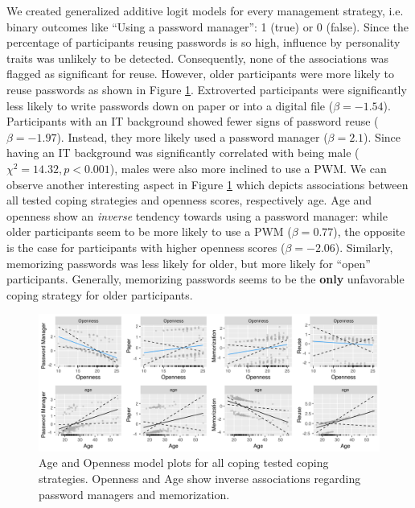 We created generalized additive logit models for every management strategy, i.e. binary outcomes like ``Using a password manager'': 1 (true) or 0 (false). Since the percentage of participants reusing passwords is so high, influence by personality traits was unlikely to be detected. Consequently, none of the associations was flagged as significant for reuse. However, older participants were more likely to reuse passwords as shown in Figure \ref{fig:personality:study3:age-openness-coping-all}. Extroverted participants were significantly less likely to write passwords down on paper or into a digital file ($\beta=-1.54$). Participants with an IT background showed fewer signs of password reuse ($\beta=-1.97$). Instead, they more likely used a password manager ($\beta=2.1$). Since having an IT background was significantly correlated with being male ($\chi^2=14.32, p < 0.001$), males were also more inclined to use a \gls{PWM}. We can observe another interesting aspect in Figure \ref{fig:personality:study3:age-openness-coping-all} which depicts associations between all tested coping strategies and openness scores, respectively age. Age and openness show an \textit{inverse} tendency towards using a password manager: while older participants seem to be more likely to use a \gls{PWM} ($\beta=0.77$), the opposite is the case for participants with higher openness scores ($\beta=-2.06$). Similarly, memorizing passwords was less likely for older, but more likely for ``open'' participants. Generally, memorizing passwords seems to be the \textbf{only} unfavorable coping strategy for older participants. 
\begin{figure}[tbph]
	\centering
	\includegraphics[width=1\linewidth]{figures/personality/png/age-openness-coping-all}
	\caption{\label{fig:personality:study3:age-openness-coping-all}Age and Openness model plots for all coping tested coping strategies. Openness and Age show inverse associations regarding password managers and memorization.}
\end{figure}

